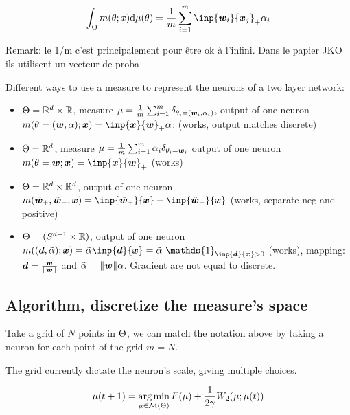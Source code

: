 \begin{equation}
	\int_\paramS m(\param; x) \dd \mu(\param) = \frac{1}{m} \sum_{i=1}^{m} \inp{\vw_i}{\vx_j}_+ \alpha_i
\end{equation}

Remark: le 1/m c'est principalement pour être ok à l'infini. Dans le papier JKO \citep{carlierConvergenceEntropicSchemes2017} ils utilisent un vecteur de proba

Different ways to use a measure to represent the neurons of a two layer network:

\begin{itemize}
	\item $\Theta = \mathbb{R}^d \times \mathbb{R}$, measure $\mu = \frac{1}{m} \sum_{i=1}^{m} \delta_{\theta_i = ({\bm{w}}_i, \alpha_i)}$, output of one neuron $m(\param=(\vw,\alpha); \vx) = \inp{\vx}{\vw}_+ \alpha$: (works, output matches discrete)
	\item $\Theta = \mathbb{R}^d$, measure $\mu = \frac{1}{m} \sum_{i=1}^{m} \alpha_i \delta_{\theta_i = {\bm{w}}_i}$ output of one neuron $m(\param=\vw; \vx) = \inp{\vx}{\vw}_+$ (works)
	\item $\Theta = \mathbb{R}^d \times \mathbb{R}^d$, output of one neuron $m(\tilde{\vw}_+, \tilde{\vw}_-, \vx) = \inp{\tilde{\vw}_+}{\vx} - \inp{\tilde{\vw}_-}{\vx}$ (works, separate neg and positive)
	\item $\Theta = (S^{d-1} \times \mathbb{R})$, output of one neuron $m((\vd, \tilde{\alpha}); \vx) = \tilde{\alpha} \inp{\vd}{\vx} = \tilde{\alpha}\  \mathds{1}_{\inp{\vd}{\vx}>0} $ (works), mapping: ${\bm{d}} = \frac{{\bm{w}}}{\lVert{\bm{w}}\rVert}$ and $\tilde{\alpha}=\lVert{\bm{w}}\rVert \alpha$. Gradient are not equal to discrete.
\end{itemize}

\subsection{Algorithm, discretize the measure's space}

Take a grid of $N$ points in $\Theta$, we can match the notation above by taking a neuron for each point of the grid $m=N$.

The grid currently dictate the neuron's scale, giving multiple choices.

\begin{equation}
	\mu(t+1) = \operatorname*{arg\,min}_{\mu \in \mathcal{M}(\Theta)} F(\mu) + \frac{1}{2 \gamma} W_2(\mu; \mu(t))
\end{equation}



